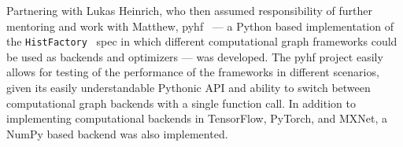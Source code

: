 Partnering with Lukas Heinrich, who then assumed responsibility of further mentoring and work with Matthew, pyhf~\cite{lukas_heinrich_2018_1172961} --- a Python based implementation of the \texttt{HistFactory}~\cite{Cranmer:2012sba} spec in which different computational graph frameworks could be used as backends and optimizers --- was developed.
The pyhf project easily allows for testing of the performance of the frameworks in different scenarios, given its easily understandable Pythonic API and ability to switch between computational graph backends with a single function call.
In addition to implementing computational backends in TensorFlow, PyTorch, and MXNet, a NumPy based backend was also implemented.\\
